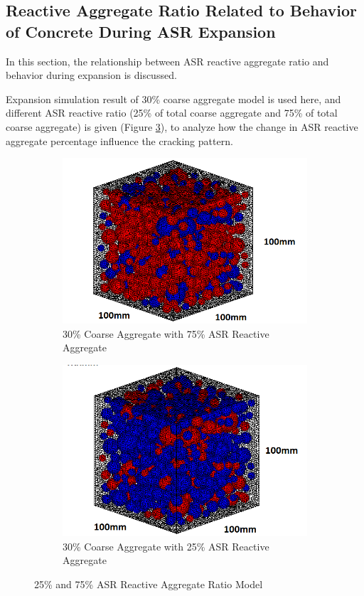 \clearpage
\subsection{Reactive Aggregate Ratio Related to Behavior of Concrete During ASR Expansion}

In this section, the relationship between ASR reactive aggregate ratio and behavior during expansion is discussed.

Expansion simulation result of 30\% coarse aggregate model is used here, and different ASR reactive ratio (25\% of total coarse aggregate and 75\% of total coarse aggregate) is given (Figure \ref{fig:Aggregate_Percentagedsfsdf}), to analyze how the change in ASR reactive aggregate percentage influence the cracking pattern.

\begin{figure}[!h]
\centering
\begin{subfigure}{.5\textwidth}
  \centering
  \includegraphics[width=.8\linewidth]{Files/Aggregate/A30P75.png}%
  \caption{30\% Coarse Aggregate with 75\% ASR Reactive Aggregate}
  \label{fig:A15_model}
\end{subfigure}%
\begin{subfigure}{.5\textwidth}
  \centering
  \includegraphics[width=.8\linewidth]{Files/Aggregate/A30P25.png} %
  \caption{30\% Coarse Aggregate with 25\% ASR Reactive Aggregate}
  \label{fig:A15_model}
\end{subfigure}
\caption{25\% and 75\% ASR Reactive Aggregate Ratio Model}
\label{fig:Aggregate_Percentagedsfsdf}
\end{figure}

